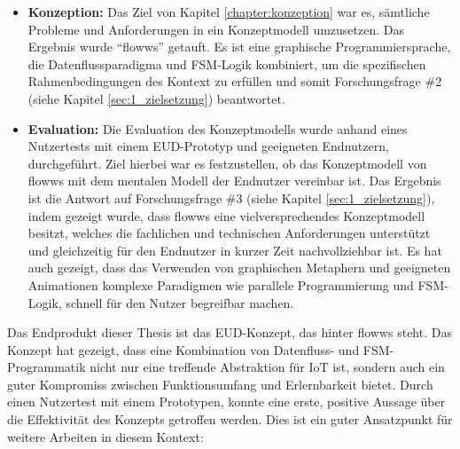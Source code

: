 \begin{itemize}
    \item \textbf{Konzeption:} Das Ziel von Kapitel \ref{chapter:konzeption} war es, sämtliche Probleme und Anforderungen in ein Konzeptmodell umzusetzen. Das Ergebnis wurde "`flowws"' getauft. Es ist eine graphische Programmiersprache, die Datenflussparadigma und \ac{FSM}-Logik kombiniert, um die spezifischen Rahmenbedingungen des Kontext zu erfüllen und somit Forschungsfrage \#2 (siehe Kapitel \ref{sec:1_zielsetzung}) beantwortet.
    \item \textbf{Evaluation:} Die Evaluation des Konzeptmodells wurde anhand eines Nutzertests mit einem \ac{EUD}-Prototyp und geeigneten Endnutzern, durchgeführt. Ziel hierbei war es festzustellen, ob das Konzeptmodell von flowws mit dem mentalen Modell der Endnutzer vereinbar ist. Das Ergebnis ist die Antwort auf Forschungsfrage \#3 (siehe Kapitel \ref{sec:1_zielsetzung}), indem gezeigt wurde, dass flowws eine vielversprechendes Konzeptmodell besitzt, welches die fachlichen und technischen Anforderungen unterstützt und gleichzeitig für den Endnutzer in kurzer Zeit nachvollziehbar ist. Es hat auch gezeigt, dass das Verwenden von graphischen Metaphern und geeigneten Animationen komplexe Paradigmen wie parallele Programmierung und \ac{FSM}-Logik, schnell für den Nutzer begreifbar machen.
\end{itemize}

Das Endprodukt dieser Thesis ist das \ac{EUD}-Konzept, das hinter flowws steht. Das Konzept hat gezeigt, dass eine Kombination von Datenfluss- und \ac{FSM}-Pro\-gram\-ma\-tik nicht nur eine treffende Abstraktion für \ac{IoT} ist, sondern auch ein guter Kompromiss zwischen Funktionsumfang und Erlernbarkeit bietet. Durch einen Nutzertest mit einem Prototypen, konnte eine erste, positive Aussage über die Effektivität des Konzepts getroffen werden. Dies ist ein guter Ansatzpunkt für weitere Arbeiten in diesem Kontext:

